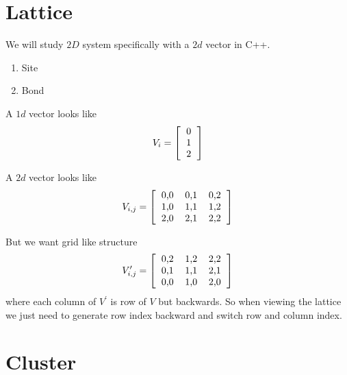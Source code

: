 \documentclass[10pt,a4paper]{report}
\begin{document}
	\section{Lattice}
	We will study $2D$ system specifically with a $2d$ vector in C++.
	\begin{enumerate}
		\item Site
		\item Bond
	\end{enumerate}
	
	A $1d$ vector looks like
	\begin{equation*}
	V_i = 
	\left[
	\begin{tabular}{c}
		0 \\ 1 \\ 2
	\end{tabular}
	\right]
	\end{equation*}
	
		A $2d$ vector looks like
	\begin{equation*}
	V_{i,j} = 
	\left[
	\begin{tabular}{cccc}
	0,0 & 0,1 & 0,2 \\
	1,0 & 1,1 & 1,2 \\
	2,0 & 2,1 & 2,2
	\end{tabular}
	\right]
	\end{equation*}
	
	But we want grid like structure 
	\begin{equation*}
	V^\prime_{i,j} = 
	\left[
	\begin{tabular}{cccc}
	0,2 & 1,2 & 2,2 \\
	0,1 & 1,1 & 2,1 \\
	0,0 & 1,0 & 2,0
	\end{tabular}
	\right]
	\end{equation*}
	where each column of $V^\prime$ is row of $V$ but backwards. So when viewing the lattice we just need to generate row index backward and  switch row and column index.

	\section{Cluster}
\end{document}
